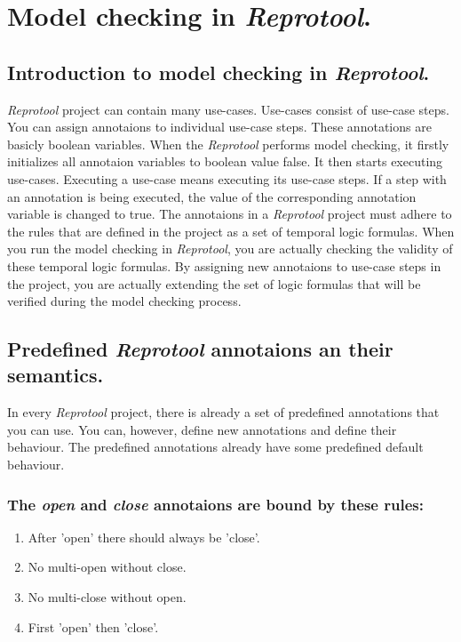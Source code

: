 \section{Model checking in \emph{Reprotool}.}

\subsection{Introduction to model checking in \emph{Reprotool}.}

\emph{Reprotool} project can contain many use-cases. Use-cases consist of use-case steps. You can assign annotaions to individual
use-case steps. These annotations are basicly boolean variables. When the \emph{Reprotool} performs model checking, it firstly
initializes all annotaion variables to boolean value false. It then starts executing use-cases. Executing a use-case means executing
its use-case steps. If a step with an annotation is being executed, the value of the corresponding  annotation variable is changed to true.
The annotaions in a \emph{Reprotool} project must adhere to the rules that are defined in the project as a set of temporal logic
formulas. When you run the model checking in \emph{Reprotool}, you are actually checking the validity of these temporal logic formulas.
By assigning new annotaions to use-case steps in the project, you are actually extending the set of logic formulas that will be verified
during the model checking process.

\subsection{Predefined \emph{Reprotool} annotaions an their semantics.}
In every \emph{Reprotool} project, there is already a set of predefined annotations that you can use. You can, however, define new
annotations and define their behaviour. The predefined annotations already have some predefined default behaviour.

\subsubsection {The \emph{open} and \emph{close} annotaions are bound by these rules:}

\begin{enumerate}
  \item After 'open' there should always be 'close'.
  \item No multi-open without close.
  \item No multi-close without open.
  \item First 'open' then 'close'.
\end{enumerate}

